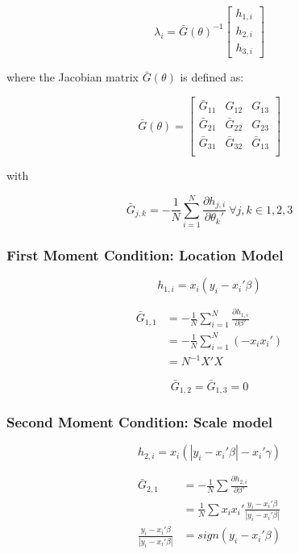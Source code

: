 \documentclass[
  authoryear,
  preprint,
  1p]{elsarticle}
\begin{document}
\[\lambda_i = \bar G(\theta)^{-1}
\begin{bmatrix}
h_{1,i} \\
h_{2,i} \\
h_{3,i}
\end{bmatrix}
\]

where the Jacobian matrix \(\bar G(\theta)\) is defined as:

\[\bar G(\theta) = \begin{bmatrix}
\bar G_{11} & G_{12} & G_{13} \\
\bar G_{21} & \bar G_{22} & G_{23} \\
\bar G_{31} & \bar G_{32} & \bar G_{13} \\
\end{bmatrix}
\]

with

\[\bar G_{j,k} = - \frac 1 N \sum_{i=1}^N \frac{\partial h_{j,i}}{\partial \theta_k'} \ \forall j,k \in 1,2,3
\]

\hypertarget{first-moment-condition-location-model}{%
\subsubsection{First Moment Condition: Location
Model}\label{first-moment-condition-location-model}}

\[h_{1,i}=x_i(y_i-x_i'\beta)\]

\[\begin{aligned}
\bar G_{1,1} &=- \frac{1}{N} \sum_{i=1}^N \frac{\partial h_{1,i}}{\partial \beta'} \\
             &=- \frac{1}{N} \sum_{i=1}^N (-x_i x_i') \\
             &= N^{-1} X'X
\end{aligned}
\]

\[
\bar G_{1,2} = \bar G_{1,3} = 0
\]

\hypertarget{second-moment-condition-scale-model}{%
\subsubsection{Second Moment Condition: Scale
model}\label{second-moment-condition-scale-model}}

\[h_{2,i}=x_i(|y_i-x_i'\beta|-x_i'\gamma)\]

\[\begin{aligned}
\bar G_{2,1} &= -\frac{1}{N} \sum \frac{\partial h_{2,i}}{\partial \beta'} \\
             &=  \frac{1}{N} \sum x_i x_i' \frac{y_i-x_i'\beta}{|y_i-x_i'\beta|} \\
\frac{y_i-x_i'\beta}{|y_i-x_i'\beta|} &= sign(y_i-x_i'\beta) \\            
\end{aligned}
\]
\end{document}
